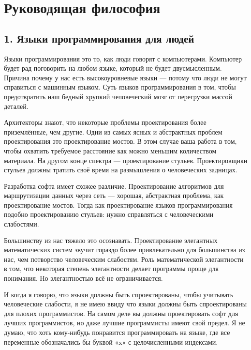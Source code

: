 \documentclass[ebook,12pt,oneside,openany]{memoir}
\begin{document}
\maketitle

\section*{Руководящая философия}

\subsection{1. Языки программирования для людей}

Языки программирования это то, как люди говорят с компьютерами.
Компьютер будет рад поговорить на любом языке, который не будет
двусмысленным. Причина почему у нас есть высокоуровневые языки —
потому что люди не могут справиться с машинным языком. Суть языков
программирования в том, чтобы предотвратить наш бедный хрупкий
человеческий мозг от перегрузки массой деталей. \newline

Архитекторы знают, что некоторые проблемы проектирования более
приземлённые, чем другие. Одни из самых ясных и абстрактных проблем
проектирования это проектирование мостов. В этом случае ваша работа в
том, чтобы охватить требуемое расстояние как можно меньшим количеством
материала. На другом конце спектра — проектирование стульев.
Проектировщики стульев должны тратить своё время на размышления о
человеческих задницах. \newline

Разработка софта имеет схожее различие. Проектирование алгоритмов для
маршрутизации данных через сеть — хорошая, абстрактная проблема, как
проектирование мостов. Тогда как проектирование языков
программирования подобно проектированию стульев: нужно справляться с
человеческими слабостями. \newline

Большинству из нас тяжело это осознавать. Проектирование элегантных
математических систем звучит гораздо более привлекательно для
большинства из нас, чем потворство человеческим слабостям. Роль
математической элегантности в том, что некоторая степень элегантности
делает программы проще для понимания. Но элегантностью всё не
ограничивается. \newline

И когда я говорю, что языки должны быть спроектированы, чтобы
учитывать человеческие слабости, я не имею ввиду что языки должны быть
спроектированы для плохих программистов. На самом деле вы должны
проектировать софт для лучших программистов, но даже лучшие
программисты имеют свой предел. Я не думаю, что хоть кому-нибудь
понравится программировать на языке, где все переменные обозначались
бы буквой «x» с целочисленными индексами. \newline
\end{document}
